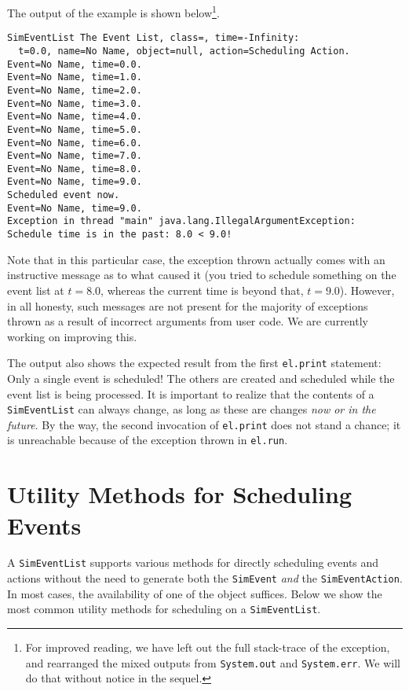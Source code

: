 The output of the example is shown below\footnote{
  For improved reading, we have left out the full stack-trace of the exception,
  and rearranged the mixed outputs from \lstinline{System.out} and \lstinline{System.err}.
  We will do that without notice in the sequel.
}.
\begin{lstlisting}[basicstyle=\tiny]
SimEventList The Event List, class=, time=-Infinity:
  t=0.0, name=No Name, object=null, action=Scheduling Action.
Event=No Name, time=0.0.
Event=No Name, time=1.0.
Event=No Name, time=2.0.
Event=No Name, time=3.0.
Event=No Name, time=4.0.
Event=No Name, time=5.0.
Event=No Name, time=6.0.
Event=No Name, time=7.0.
Event=No Name, time=8.0.
Event=No Name, time=9.0.
Scheduled event now.
Event=No Name, time=9.0.
Exception in thread "main" java.lang.IllegalArgumentException:
Schedule time is in the past: 8.0 < 9.0!
\end{lstlisting}
Note that in this particular case,
  the exception thrown actually comes with an
  instructive message as to what caused it
  (you tried to schedule something on the event list at $t=8.0$,
   whereas the current time is beyond that, $t=9.0$).
However, in all honesty,
  such messages are not present
  for the majority of exceptions thrown
  as a result of incorrect arguments from user code.
We are currently working on improving this.

The output also shows the expected result from the first \lstinline{el.print} statement:
Only a single event is scheduled!
The others are created and scheduled while the event list is being processed.
It is important to realize that the contents of a \lstinline{SimEventList}
  can always change, as long as these are changes {\em now or in the future}.
By the way, the second invocation of \lstinline{el.print} does not stand a chance;
  it is unreachable because of the exception thrown in \lstinline{el.run}.

\section{Utility Methods for Scheduling Events}

A \lstinline{SimEventList} supports various methods for
  directly scheduling events and actions
  without the need to generate both
  the \lstinline{SimEvent} {\em and\/} the \lstinline{SimEventAction}.
In most cases, the availability of one of the object suffices.
Below we show the most common utility methods for scheduling on a \lstinline{SimEventList}.

